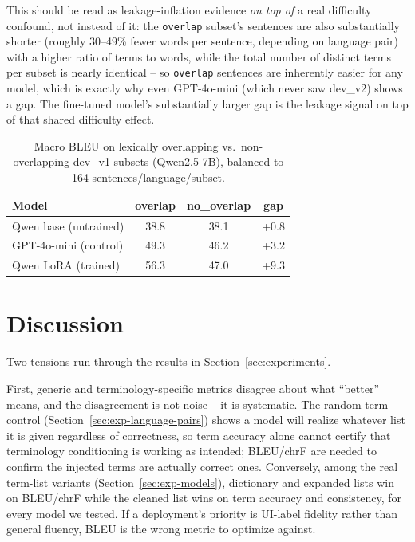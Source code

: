 \documentclass[11pt]{article}
\begin{document}
This should be read as leakage-inflation evidence \emph{on top of} a real difficulty confound, not instead of it: the \texttt{overlap} subset's sentences are also substantially shorter (roughly 30--49\% fewer words per sentence, depending on language pair) with a higher ratio of terms to words, while the total number of distinct terms per subset is nearly identical -- so \texttt{overlap} sentences are inherently easier for any model, which is exactly why even GPT-4o-mini (which never saw dev\_v2) shows a gap. The fine-tuned model's substantially larger gap is the leakage signal on top of that shared difficulty effect.

\begin{table}[t]
  \centering
  \small
  \begin{tabular}{lccc}
    \hline
    \textbf{Model} & \textbf{overlap} & \textbf{no\_overlap} & \textbf{gap} \\
    \hline
    Qwen base (untrained) & 38.8 & 38.1 & +0.8 \\
    GPT-4o-mini (control) & 49.3 & 46.2 & +3.2 \\
    Qwen LoRA (trained)   & 56.3 & 47.0 & +9.3 \\
    \hline
  \end{tabular}
  \caption{Macro BLEU on lexically overlapping vs.\ non-overlapping dev\_v1 subsets (Qwen2.5-7B), balanced to 164 sentences/language/subset.}
  \label{tab:leakage}
\end{table}

\section{Discussion}
\label{sec:discussion}

Two tensions run through the results in Section~\ref{sec:experiments}.

First, generic and terminology-specific metrics disagree about what ``better'' means, and the disagreement is not noise -- it is systematic. The random-term control (Section~\ref{sec:exp-language-pairs}) shows a model will realize whatever list it is given regardless of correctness, so term accuracy alone cannot certify that terminology conditioning is working as intended; BLEU/chrF are needed to confirm the injected terms are actually correct ones. Conversely, among the real term-list variants (Section~\ref{sec:exp-models}), dictionary and expanded lists win on BLEU/chrF while the cleaned list wins on term accuracy and consistency, for every model we tested. If a deployment's priority is UI-label fidelity rather than general fluency, BLEU is the wrong metric to optimize against.
\end{document}

